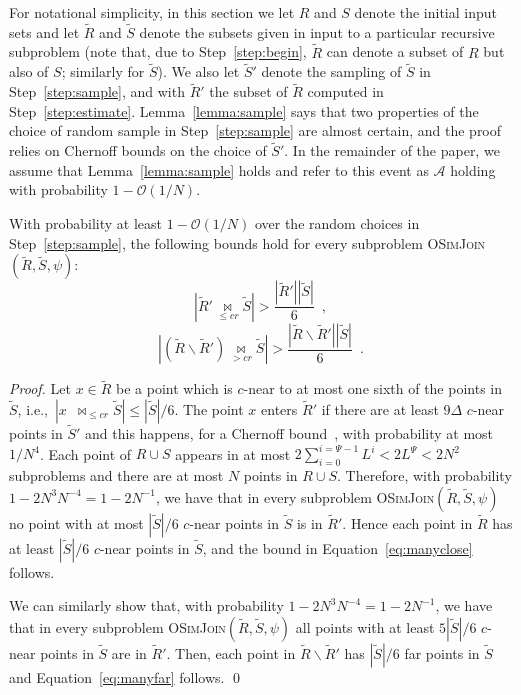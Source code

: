 \documentclass{llncs}
\newcommand{\Osymbol}{{\mathcal O}}
\newcommand{\BO}[1]{\Osymbol\left(#1\right)}
\newcommand{\SimJoin}{\textsc{OSimJoin}}
\begin{document}
For notational simplicity, in this section we let $R$ and $S$ denote the initial input sets and let $\tilde R$ and $\tilde S$ denote the subsets given in input to a particular recursive subproblem (note that, due to Step~\ref{step:begin}, $\tilde R$  can denote a subset of $R$ but also of $S$; similarly for $\tilde S$). 
We also let $\tilde S'$ denote the sampling of $\tilde S$ in Step~\ref{step:sample}, and with $\tilde R'$ the subset of $\tilde R$ computed in Step~\ref{step:estimate}. 
Lemma~\ref{lemma:sample} says that two properties of the choice of random sample in Step~\ref{step:sample} are almost certain, and the proof relies on Chernoff bounds on the choice of $\tilde S'$. 
In the remainder of the paper, we assume that Lemma~\ref{lemma:sample} holds and refer to this event as $\mathcal{A}$ holding with probability $1-\BO{1/N}$.


\begin{lemma}\label{lemma:sample}
With probability at least $1-\BO{1/N}$ over the random choices in Step~\ref{step:sample},
the following bounds hold for every  subproblem \SimJoin$(\tilde R,\tilde S,\psi)$:
\begin{equation}\label{eq:manyclose}
|\tilde R' \underset{\leq cr}{\bowtie} \tilde S| > \frac{|\tilde R'| |\tilde
S|}{6} \enspace,
\end{equation}
\begin{equation}\label{eq:manyfar}
 |(\tilde R\backslash \tilde R') \underset{> cr}{\bowtie} \tilde S| >
\frac{|\tilde R\backslash \tilde R'| |\tilde S|}{6} \enspace .
\end{equation}
\end{lemma}

\begin{proof}



Let $x\in \tilde R$ be a point which is $c$-near to at most one sixth of the points in $\tilde S$, 
i.e.,~$|x \enspace {\bowtie}_{\leq cr} \tilde S| \leq |\tilde S|/6$.
The point $x$ enters $\tilde R'$ if there are at least $9\Delta$ $c$-near points in 
$\tilde S'$ and this happens, for a 
Chernoff bound~\cite[Theorem 1.1]{PanconesiDubhashiBook},  with probability at most $1/N^4$.
Each point of $R\cup S$  appears in at most $2 \sum_{i=0}^{i=\Psi - 1} L^i < 2 L^\Psi < 2N^2$ subproblems 
and there are at most $N$ points in $R\cup S$.
Therefore, with probability $1-2N^3N^{-4} = 1-2N^{-1}$, we have that 
in every subproblem \SimJoin$(\tilde R,\tilde S,\psi)$ no point with at most $|\tilde S|/6$ $c$-near 
points in $\tilde S$ is in $\tilde R'$. Hence each point in $\tilde R$ has at least  $|\tilde S|/6$ $c$-near 
points in $\tilde S$, and the bound in Equation~\ref{eq:manyclose} follows.


We can similarly show that,  with probability $1-2N^3N^{-4} = 1-2N^{-1}$, we have that 
in every subproblem \SimJoin$(\tilde R,\tilde S,\psi)$ all points with at least  $5|\tilde S|/6$ $c$-near 
points in $\tilde S$ are in $\tilde R'$. Then, each point in $\tilde R\backslash \tilde R'$ has $ |\tilde S|/6$
far points in $\tilde S$ and Equation~\ref{eq:manyfar} follows.
\qed

\end{proof}
\end{document}
